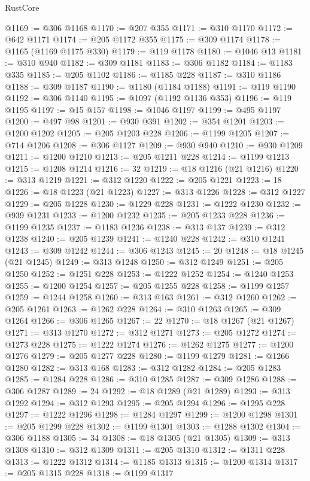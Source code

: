 \begin{lexlean}{RustCore}
\begin{coremodule}
@1169 := @306 @1168
@1170 := @207 @355
@1171 := @310 @1170
@1172 := @642 @1171
@1174 := @205 @1172 @355
@1175 := @309 @1174
@1178 := @1165 (@1169 @1175 @330)
@1179 := @119 @1178
@1180 := @1046 @13
@1181 := @310 @940
@1182 := @309 @1181
@1183 := @306 @1182
@1184 := @1183 @335
@1185 := @205 @1102
@1186 := @1185 @228
@1187 := @310 @1186
@1188 := @309 @1187
@1190 := @1180 (@1184 @1188)
@1191 := @119 @1190
@1192 := @306 @1140
@1195 := @1097 (@1192 @1136 @353)
@1196 := @119 @1195
@1197 := @15 @157
@1198 := @1046 @1197
@1199 := @495 @1197
@1200 := @497 @98
@1201 := @930 @391
@1202 := @354 @1201
@1203 := @1200 @1202
@1205 := @205 @1203 @228
@1206 := @1199 @1205
@1207 := @714 @1206
@1208 := @306 @1127
@1209 := @930 @940
@1210 := @930 @1209
@1211 := @1200 @1210
@1213 := @205 @1211 @228
@1214 := @1199 @1213
@1215 := @1208 @1214
@1216 := 32
@1219 := @18 @1216 (@21 @1216)
@1220 := @313 @1219
@1221 := @312 @1220
@1222 := @205 @1221
@1223 := 18
@1226 := @18 @1223 (@21 @1223)
@1227 := @313 @1226
@1228 := @312 @1227
@1229 := @205 @1228
@1230 := @1229 @228
@1231 := @1222 @1230
@1232 := @939 @1231
@1233 := @1200 @1232
@1235 := @205 @1233 @228
@1236 := @1199 @1235
@1237 := @1183 @1236
@1238 := @313 @137
@1239 := @312 @1238
@1240 := @205 @1239
@1241 := @1240 @228
@1242 := @310 @1241
@1243 := @309 @1242
@1244 := @306 @1243
@1245 := 20
@1248 := @18 @1245 (@21 @1245)
@1249 := @313 @1248
@1250 := @312 @1249
@1251 := @205 @1250
@1252 := @1251 @228
@1253 := @1222 @1252
@1254 := @1240 @1253
@1255 := @1200 @1254
@1257 := @205 @1255 @228
@1258 := @1199 @1257
@1259 := @1244 @1258
@1260 := @313 @163
@1261 := @312 @1260
@1262 := @205 @1261
@1263 := @1262 @228
@1264 := @310 @1263
@1265 := @309 @1264
@1266 := @306 @1265
@1267 := 22
@1270 := @18 @1267 (@21 @1267)
@1271 := @313 @1270
@1272 := @312 @1271
@1273 := @205 @1272
@1274 := @1273 @228
@1275 := @1222 @1274
@1276 := @1262 @1275
@1277 := @1200 @1276
@1279 := @205 @1277 @228
@1280 := @1199 @1279
@1281 := @1266 @1280
@1282 := @313 @168
@1283 := @312 @1282
@1284 := @205 @1283
@1285 := @1284 @228
@1286 := @310 @1285
@1287 := @309 @1286
@1288 := @306 @1287
@1289 := 24
@1292 := @18 @1289 (@21 @1289)
@1293 := @313 @1292
@1294 := @312 @1293
@1295 := @205 @1294
@1296 := @1295 @228
@1297 := @1222 @1296
@1298 := @1284 @1297
@1299 := @1200 @1298
@1301 := @205 @1299 @228
@1302 := @1199 @1301
@1303 := @1288 @1302
@1304 := @306 @1188
@1305 := 34
@1308 := @18 @1305 (@21 @1305)
@1309 := @313 @1308
@1310 := @312 @1309
@1311 := @205 @1310
@1312 := @1311 @228
@1313 := @1222 @1312
@1314 := @1185 @1313
@1315 := @1200 @1314
@1317 := @205 @1315 @228
@1318 := @1199 @1317

\end{coremodule}
\end{lexlean}
